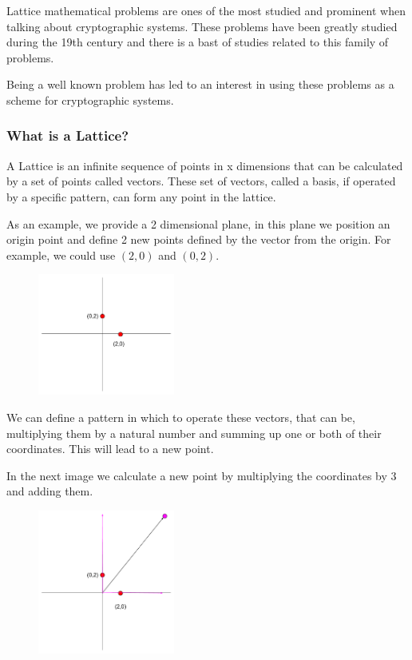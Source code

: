 Lattice mathematical problems are ones of the most studied and prominent when
talking about cryptographic systems. These problems have been greatly studied
during the 19th century and there is a bast of studies related to this family of
problems.

Being a well known problem has led to an interest in using these problems as a
scheme for cryptographic systems.

\subsubsection{ What is a Lattice?  }

A Lattice is an infinite sequence of points in x dimensions that can be
calculated by a set of points called vectors. These set of vectors, called a
basis, if operated by a specific pattern, can form any point in the lattice.\cite{matthew_dozer_introduction_2017}\cite{wickr_what_2020}

As an example, we provide a 2 dimensional plane, in this plane we position an
origin point and define 2 new points defined by the vector from the origin. For
example, we could use $(2,0)$ and $(0,2)$.

\begin{figure}[H]
    \centering
    \includegraphics[width=0.4\textwidth]{images/lattice0}
\end{figure}

We can define a pattern in which to operate these vectors, that can be,
multiplying them by a natural number and summing up one or both of their
coordinates. This will lead to a new point.

In the next image we calculate a new point by multiplying the coordinates by 3
and adding them.

\begin{figure}[H]
    \centering
    \includegraphics[width=0.4\textwidth]{images/lattice1}
\end{figure}

